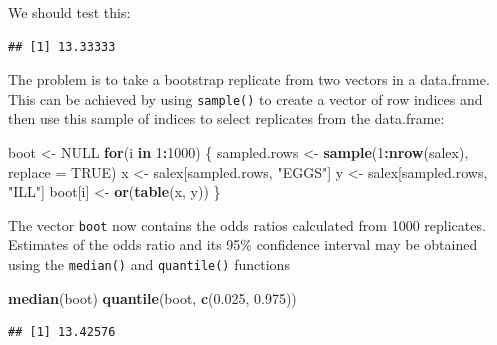 \documentclass[12pt,a4paper]{book}
\newenvironment{Shaded}{\begin{snugshade}}{\end{snugshade}}
\newcommand{\KeywordTok}[1]{\textcolor[rgb]{0.13,0.29,0.53}{\textbf{#1}}}
\newcommand{\DataTypeTok}[1]{\textcolor[rgb]{0.13,0.29,0.53}{#1}}
\newcommand{\DecValTok}[1]{\textcolor[rgb]{0.00,0.00,0.81}{#1}}
\newcommand{\FloatTok}[1]{\textcolor[rgb]{0.00,0.00,0.81}{#1}}
\newcommand{\StringTok}[1]{\textcolor[rgb]{0.31,0.60,0.02}{#1}}
\newcommand{\OtherTok}[1]{\textcolor[rgb]{0.56,0.35,0.01}{#1}}
\newcommand{\ControlFlowTok}[1]{\textcolor[rgb]{0.13,0.29,0.53}{\textbf{#1}}}
\newcommand{\OperatorTok}[1]{\textcolor[rgb]{0.81,0.36,0.00}{\textbf{#1}}}
\newcommand{\NormalTok}[1]{#1}
\theoremstyle{definition}
\theoremstyle{definition}
\theoremstyle{definition}
\theoremstyle{remark}
\begin{document}
We should test this:

\begin{Shaded}
\end{Shaded}

\begin{verbatim}
## [1] 13.33333
\end{verbatim}

The problem is to take a bootstrap replicate from two vectors in a
data.frame. This can be achieved by using \texttt{sample()} to create a
vector of row indices and then use this sample of indices to select
replicates from the data.frame:

\begin{Shaded}
\begin{Highlighting}[]
\NormalTok{boot <-}\StringTok{ }\OtherTok{NULL}
\ControlFlowTok{for}\NormalTok{(i }\ControlFlowTok{in} \DecValTok{1}\OperatorTok{:}\DecValTok{1000}\NormalTok{) \{}
\NormalTok{  sampled.rows <-}\StringTok{ }\KeywordTok{sample}\NormalTok{(}\DecValTok{1}\OperatorTok{:}\KeywordTok{nrow}\NormalTok{(salex), }\DataTypeTok{replace =} \OtherTok{TRUE}\NormalTok{)}
\NormalTok{  x <-}\StringTok{ }\NormalTok{salex[sampled.rows, }\StringTok{"EGGS"}\NormalTok{]}
\NormalTok{  y <-}\StringTok{ }\NormalTok{salex[sampled.rows, }\StringTok{"ILL"}\NormalTok{]}
\NormalTok{  boot[i] <-}\StringTok{ }\KeywordTok{or}\NormalTok{(}\KeywordTok{table}\NormalTok{(x, y))}
\NormalTok{\}}
\end{Highlighting}
\end{Shaded}

The vector \texttt{boot} now contains the odds ratios calculated from
1000 replicates. Estimates of the odds ratio and its 95\% confidence
interval may be obtained using the \texttt{median()} and
\texttt{quantile()} functions

\begin{Shaded}
\begin{Highlighting}[]
\KeywordTok{median}\NormalTok{(boot)}
\KeywordTok{quantile}\NormalTok{(boot, }\KeywordTok{c}\NormalTok{(}\FloatTok{0.025}\NormalTok{, }\FloatTok{0.975}\NormalTok{))}
\end{Highlighting}
\end{Shaded}

\begin{verbatim}
## [1] 13.42576
\end{verbatim}
\end{document}
